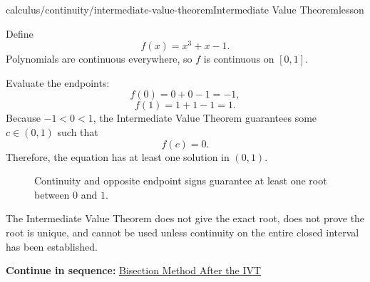 \documentclass[11pt,openany]{book}
\theoremstyle{bgplain}
\newcounter{bgexample}[chapter]
\newcommand{\webnext}[2]{%
  \par\addvspace{1.2em}\noindent{\color{BGLine}\rule{\textwidth}{0.35pt}}\par\smallskip
  {\small\color{BGGray}\textbf{Continue in sequence:} \hyperlink{web:#1}{#2}}\par
}
\begin{document}
\begin{webpage}{calculus/continuity/intermediate-value-theorem}{Intermediate Value Theorem}{lesson}
\begin{bgexample}[title={Prove a polynomial has a root}]
\begin{bgsolution}
Define
\[
  f(x)=x^3+x-1.
\]
Polynomials are continuous everywhere, so \(f\) is continuous on \([0,1]\).

Evaluate the endpoints:
\[
  f(0)=0+0-1=-1,
\]
\[
  f(1)=1+1-1=1.
\]
Because \(-1<0<1\), the Intermediate Value Theorem guarantees some \(c\in(0,1)\) such that
\[
  f(c)=0.
\]
Therefore, the equation has at least one solution in \((0,1)\).
\end{bgsolution}
\end{bgexample}

\begin{figure}[htbp]
\centering
{}
\caption{Continuity and opposite endpoint signs guarantee at least one root between \(0\) and \(1\).}
\label{fig:ivt}
\end{figure}

\begin{bgexamnote}
The Intermediate Value Theorem does not give the exact root, does not prove the root is unique, and cannot be used unless continuity on the entire closed interval has been established.
\end{bgexamnote}
\webnext{calculus/continuity/bisection-method}{Bisection Method After the IVT}
\end{webpage}
\end{document}
